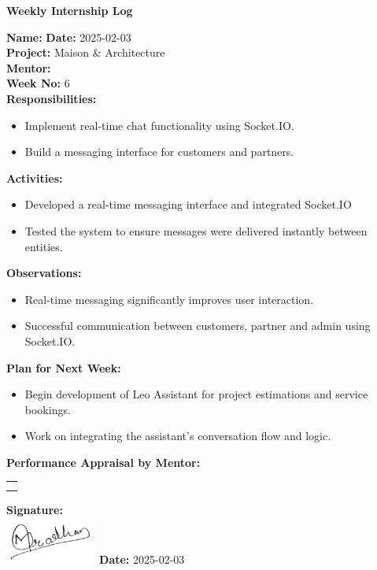 \begin{center}
    \bfseries Weekly Internship Log
\end{center}

\noindent
\textbf{Name:}  \hfill \textbf{Date:} 2025-02-03 \\
\textbf{Project:} Maison \& Architecture \hfill \\
\textbf{Mentor:}  \\
\textbf{Week No:} 6 \\

\noindent
\textbf{Responsibilities:}
\begin{itemize}
    \item Implement real-time chat functionality using Socket.IO.
    \item Build a messaging interface for customers and partners.
\end{itemize}

\noindent
\textbf{Activities:}
\begin{itemize}
    \item Developed a real-time messaging interface and integrated Socket.IO
    \item Tested the system to ensure messages were delivered instantly between entities.
\end{itemize}

\noindent
\textbf{Observations:}
\begin{itemize}
    \item Real-time messaging significantly improves user interaction.
    \item Successful communication between customers, partner and admin using Socket.IO.
\end{itemize}

\noindent
\textbf{Plan for Next Week:}
\begin{itemize}
    \item Begin development of Leo Assistant for project estimations and service bookings.
    \item Work on integrating the assistant’s conversation flow and logic.
\end{itemize}

\noindent
\textbf{Performance Appraisal by Mentor:} \\
\begin{table}[h]
    \centering
    \noindent
    \begin{tabularx}{\textwidth} { 
        | >{\centering\arraybackslash}X| }

        \hline
        \\ \\
        \hline
    \end{tabularx}
\end{table}

\vfill
\noindent
\textbf{Signature:} \\
\includegraphics[width=3cm]{assets/nirajpradhan-sign.png} \hfill \textbf{Date:} 2025-02-03